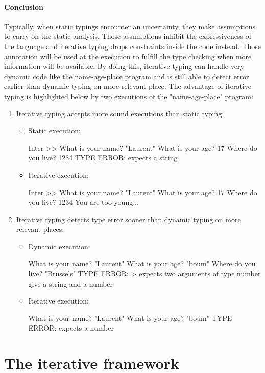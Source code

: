 \documentclass[a4paper]{report}
\begin{document}
\paragraph{Conclusion} Typically, when static typings encounter an uncertainty, they make assumptions to carry on the static analysis. Those assumptions inhibit the expressiveness of the language and iterative typing drops constraints inside the code instead. Those annotation will be used at the execution to fulfill the type checking when more information will be available. By doing this, iterative typing can handle very dynamic code like the name-age-place program and is still able to detect error earlier than dynamic typing on more relevant place. The advantage of iterative typing is highlighted below by two executions of the "name-age-place" program:
\begin{enumerate}
\item Iterative typing accepts more sound executions than static typing:
\begin{itemize}
\item Static execution:
\begin{shell}
Inter >> What is your name?
"Laurent"
What is your age?
17
Where do you live?
1234
TYPE ERROR: expects a string
\end{shell}
\item Iterative execution:
\begin{shell}
Inter >> What is your name?
"Laurent"
What is your age?
17
Where do you live?
1234
You are too young...
\end{shell}
\end{itemize}
\item Iterative typing detects type error sooner than dynamic typing on more relevant places:
\begin{itemize}
\item Dynamic execution:
\begin{shell}
What is your name?
"Laurent"
What is your age?
"boum"
Where do you live?
"Brussels"
TYPE ERROR: > expects two arguments of type number give a string and a number
\end{shell}
\item Iterative execution:
\begin{shell}
What is your name?
"Laurent"
What is your age?
"boum"
TYPE ERROR: expects a number
\end{shell}
\end{itemize}
\end{enumerate}

\section{The iterative framework}
  
\end{document}
